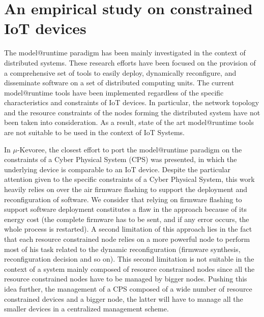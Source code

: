 \section{An empirical study on constrained IoT devices}
The model@runtime paradigm has been mainly investigated in the context of distributed systems. 
These research efforts have been focused on the provision of a comprehensive set of tools to easily deploy, dynamically reconfigure, and disseminate software on a set of distributed computing units.
The current model@runtime tools have been implemented regardless of the specific characteristics and constraints of IoT devices.
In particular, the network topology and the resource constraints of the nodes forming the distributed system have not been taken into consideration.
As a result, state of the art model@runtime tools are not suitable to be used in the context of IoT Systems.

In \cite{fouquet2012dynamic} $\mu$-Kevoree, the closest effort to port the model@runtime paradigm on the constraints of a Cyber Physical System (CPS) was presented, in which the underlying device is comparable to an IoT device.
Despite the particular attention given to the specific constraints of a Cyber Physical System, this work heavily relies on over the air firmware flashing to support the deployment and reconfiguration of software. 
We consider that relying on firmware flashing to support software deployment constitutes a flaw in the approach because of its energy cost (the complete firmware has to be sent, and if any error occurs, the whole process is restarted).
A second limitation of this approach lies in the fact that each resource constrained node relies on a more powerful node to perform most of his task related to the dynamic reconfiguration (firmware synthesis, reconfiguration decision and so on).
This second limitation is not suitable in the context of a system mainly composed of resource constrained nodes since all the resource constrained nodes have to be managed by bigger nodes.
Pushing this idea further, the management of a CPS composed of a wide number of resource constrained devices and a bigger node, the latter will have to manage all the smaller devices in a centralized management scheme.

